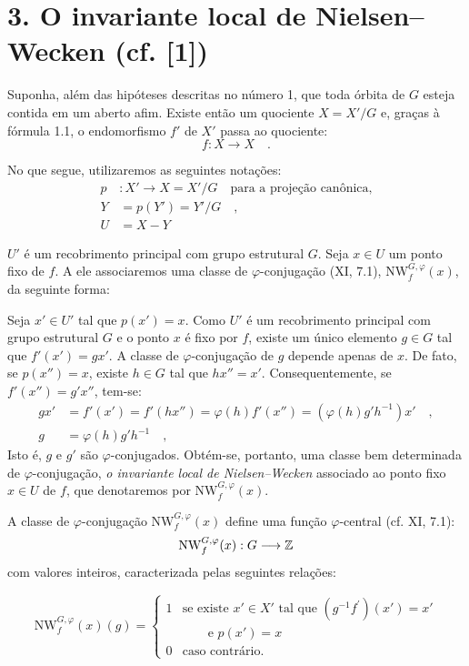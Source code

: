 \section*{3. O invariante local de Nielsen--Wecken (cf. [1])}
Suponha, além das hipóteses descritas no número 1, que toda órbita de $G$ esteja contida em um aberto afim. Existe então um quociente $X = X'/G$ e, graças à fórmula 1.1, o endomorfismo $f'$ de $X'$ passa ao quociente:
\[
f : X \longrightarrow X \quad .
\]

No que segue, utilizaremos as seguintes notações:
\begin{align*}
p &: X' \longrightarrow X = X'/G \quad \text{para a projeção canônica,} \\
Y &= p(Y') = Y'/G \quad , \\
U &= X - Y
\end{align*}

$U'$ é um recobrimento principal com grupo estrutural $G$. Seja $x \in U$ um ponto fixo de $f$. A ele associaremos uma classe de $\varphi$-conjugação (XI, 7.1), $\mathrm{NW}_{f}^{G,\varphi}(x)$, da seguinte forma:

Seja $x' \in U'$ tal que $p(x') = x$. Como $U'$ é um recobrimento principal com grupo estrutural $G$ e o ponto $x$ é fixo por $f$, existe um único elemento $g \in G$ tal que $f'(x') = gx'$. A classe de $\varphi$-conjugação de $g$ depende apenas de $x$. De fato, se $p(x'') = x$, existe $h \in G$ tal que $hx'' = x'$. Consequentemente, se $f'(x'') = g'x''$, tem-se:
\begin{align*}
gx' &= f'(x') = f'(hx'') = \varphi(h)f'(x'') = (\varphi(h)g'h^{-1})x' \quad , \\
g &= \varphi(h)g'h^{-1} \quad ,
\end{align*}
Isto é, $g$ e $g'$ são $\varphi$-conjugados. Obtém-se, portanto, uma classe bem determinada de $\varphi$-conjugação, \emph{o invariante local de Nielsen--Wecken} associado ao ponto fixo $x \in U$ de $f$, que denotaremos por $\mathrm{NW}_{f}^{G,\varphi}(x)$.

A classe de $\varphi$-conjugação $\mathrm{NW}_{f}^{G,\varphi}(x)$ define uma função $\varphi$-central (cf. XI, 7.1):
\[
\mathrm{NW}_{f}^{G,\varphi}(x) : G \longrightarrow \mathbb Z
\]
com valores inteiros, caracterizada pelas seguintes relações:

\begin{equation}\tag{3.1}
\mathrm{NW}_{f}^{G,\varphi}(x)(g) = \begin{cases} 1 & \text{se existe } x' \in X' \text{ tal que } (g^{-1}f^{\prime})(x') = x' \\ & \qquad \text{e } p(x') = x \\ 0 & \text{caso contrário.} \end{cases}
\end{equation}
